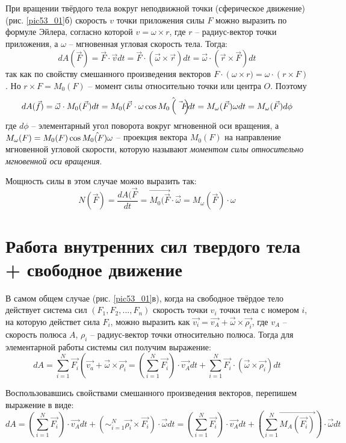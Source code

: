 При вращении твёрдого тела вокруг неподвижной точки 
(сферическое движение) (рис. \ref{pic53_01}б) скорость \( v \) точки 
приложения силы \( F \) можно выразить по 
формуле Эйлера, согласно которой \( v = \omega\times r \), где 
\( r \) -- радиус-вектор точки приложения, а \( \omega \) -- 
мгновенная угловая скорость тела. Тогда:
\[ 
	dA(\vec{F}) = \vec{F}\cdot\vec{v}dt = 
	\vec{F}\cdot\left( \vec{\omega}\times\vec{r} \right)dt =
	\vec{\omega}\cdot\left( \vec{r}\times\vec{F} \right)dt
\]
так как по свойству смешанного произведения векторов 
\( F\cdot\left( \omega\times r) = \omega\cdot\left( r\times F\right) \). 
Но \( r\times F = M_0(F) \) -- момент силы относительно точки или 
центра \( O \). Поэтому 
\[ 
	dA(\vec{f}) = \vec{\omega}\cdot M_0(\vec{F})dt = 
	M_0(\vec{F}\cdot\omega\cos\Hat{M_0\left( \vec{F} \right)}dt =
	M_\omega(\vec{F})\omega dt = M_\omega(\vec{F})d\phi
\]
где \( d\phi \) -- элементарный угол поворота вокруг мгновенной оси 
вращения, а \( M_\omega(F) = M_0(F)\cos\Hat{M_0(F)\omega} \) -- 
проекция вектора \( M_0(F) \) на направление мгновенной угловой 
скорости, которую называют \emph{моментом силы относительно мгновенной 
оси вращения}.

Мощность силы в этом случае можно выразить так:
\[ 
	N(\vec{F}) = \frac{dA(\vec{F}}{dt} = 
	\vec{M_0(\vec{F}}\cdot\vec{\omega} =
	M_\omega(\vec{F})\cdot\omega
\]

\section{Работа внутренних сил твердого тела + свободное движение}

В самом общем случае (рис. \ref{pic53_01}в), когда на свободное твёрдое тело 
действует система сил \( \left( F_1, F_2, ..., F_n \right) \) скорость 
точки \( v_i \) точки тела с номером \( i \), на которую действет сила 
\( F_i \), можно выразить как 
\( \vec{v_i} = \vec{v_A} + \vec{\omega}\times\vec{\rho_i} \), 
где \( v_A \) -- скорость полюса \( A \), \( \rho_i \) -- радиус-вектор 
точки относительно полюса. Тогда для элементарной работы системы сил 
получим выражение:
\[ 
	dA = \sum_{i=1}^{N} \vec{F_i}
	\left( \vec{v_a} + \vec{\omega}\times\vec{\rho_i} =
	\left( \sum_{i=1}^{N}\vec{F_i} \right)\cdot\vec{v_A}dt + 
	\sum_{i=1}^{N}\vec{F_i}\cdot\left( \vec{\omega}\times\vec{\rho_i} \right)dt
\]

Воспользовавшись свойствами смешанного произведения векторов, перепишем 
выражение в виде:
\[ 
	dA = \left( \sum_{i=1}^{N}\vec{F_i} \right)\cdot\vec{v_A}dt + 
	\left( \sim_{i=1}^{N} \vec{\rho_i}\times\vec{F_i}\right)\cdot\vec{\omega}dt = 
	\left( \sum_{i=1}^{N}\vec{F_i} \right)\cdot\vec{v_A}dt + 
	\left( \sum_{i=1}^{N} \vec{M_A(\vec{F_i})} \right)\cdot\vec{\omega}dt
\]

